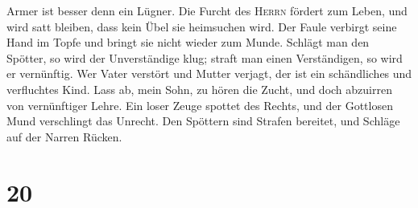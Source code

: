 Armer ist besser denn ein Lügner.  Die Furcht des
\textsc{Herrn} fördert zum Leben, und wird satt bleiben, dass kein Übel
sie heimsuchen wird.  Der Faule verbirgt seine Hand im
Topfe und bringt sie nicht wieder zum Munde.  Schlägt man
den Spötter, so wird der Unverständige klug; straft man einen
Verständigen, so wird er vernünftig.  Wer Vater verstört
und Mutter verjagt, der ist ein schändliches und verfluchtes Kind.
 Lass ab, mein Sohn, zu hören die Zucht, und doch
abzuirren von vernünftiger Lehre.  Ein loser Zeuge
spottet des Rechts, und der Gottlosen Mund verschlingt das Unrecht.
 Den Spöttern sind Strafen bereitet, und Schläge auf der
Narren Rücken.

\hypertarget{section-19}{%
\section{20}\label{section-19}}

